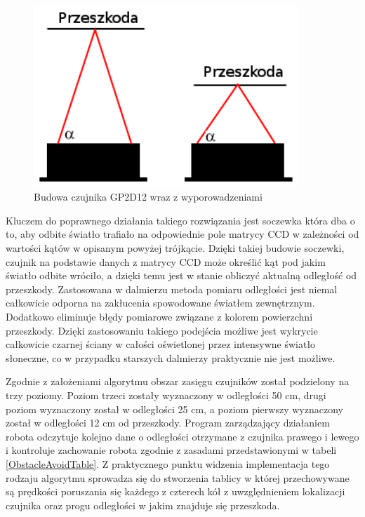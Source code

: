 \begin{figure}[hb]
 \centering
 \includegraphics[width=100mm]{../images/ch04/gp2d12_operation_theory.png}
 \caption{Budowa czujnika GP2D12 wraz z wyporowadzeniami\cite{GP2D12DataSheet}}
 \label{fig:SharpGP2D12}
\end{figure}

 Kluczem do poprawnego działania takiego rozwiązania jest soczewka która dba o to, aby
odbite światło trafiało na odpowiednie pole matrycy CCD w zależności od wartości
kątów w opisanym powyżej trójkącie. Dzięki takiej budowie soczewki, czujnik na
podstawie danych z matrycy CCD może określić kąt pod jakim światło odbite
wróciło, a dzięki temu jest w stanie obliczyć aktualną odległość od przeszkody.
Zastosowana w dalmierzu metoda pomiaru odległości jest niemal całkowicie odporna
na zakłucenia spowodowane światłem zewnętrznym. Dodatkowo eliminuje błędy
pomiarowe związane z kolorem powierzchni przeszkody. Dzięki zastosowaniu takiego
podejścia możliwe jest wykrycie całkowicie czarnej ściany w całości oświetlonej
przez intensywne światło słoneczne, co w przypadku starszych dalmierzy
praktycznie nie jest możliwe. 

Zgodnie z założeniami algorytmu obszar zasięgu czujników został podzielony na
trzy poziomy. Poziom trzeci zostały wyznaczony w odległości 50 cm, drugi poziom
wyznaczony został w odległości 25 cm, a poziom pierwszy wyznaczony został w
odległości 12 cm od przeszkody. Program zarządzający działaniem robota odczytuje
kolejno dane o odległości otrzymane z czujnika prawego i lewego i kontroluje
zachowanie robota zgodnie z zasadami przedstawionymi w tabeli
\ref{ObstacleAvoidTable}. Z praktycznego punktu widzenia implementacja tego
rodzaju algorytmu sprowadza się do stworzenia tablicy w której przechowywane są
prędkości poruszania się każdego z czterech kół z uwzględnieniem lokalizacji
czujnika oraz progu odległości w jakim znajduje się przeszkoda.


